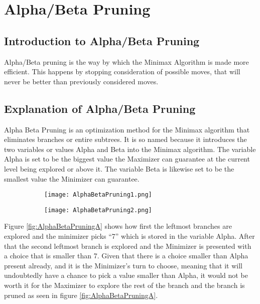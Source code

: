 \section{Alpha/Beta Pruning} 
\label{sec:Alpha/Beta Pruning}

\subsection{Introduction to Alpha/Beta Pruning}
\label{subsec:Introduction to Alpha/Beta Pruning}
Alpha/Beta pruning is the way by which the Minimax Algorithm is made more efficient.
This happens by stopping consideration of possible moves, that will never be better than previously considered moves.

\subsection{Explanation of Alpha/Beta Pruning}
\label{subsec:Explanation of Alpha/Beta Pruning}
Alpha Beta Pruning is an optimization method for the Minimax algorithm that eliminates branches or entire subtrees. 
It is so named because it introduces the two variables or values Alpha and Beta into the Minimax algorithm.
The variable Alpha is set to be the biggest value the Maximizer can guarantee at the current level being explored or above it.
The variable Beta is likewise set to be the smallest value the Minimizer can guarantee.

\begin{figure}
    \caption{An example of Alpha Beta Pruning} %
    \label{fig:AlphaBetaPruningA}
    \centering %
    \begin{subfigure}[b]{0.3\textwidth}
        \texttt{[image: AlphaBetaPruning1.png]}           
    \end{subfigure}
    \begin{subfigure}[b]{0.3\textwidth}
        \texttt{[image: AlphaBetaPruning2.png]}       
    \end{subfigure}
  \end{figure}

Figure \ref{fig:AlphaBetaPruningA} shows how first the leftmost branches are explored 
and the minimizer picks “7” which is stored in the variable Alpha. 
After that the second leftmost branch is explored and the Minimizer is presented with a choice that is smaller than 7.
Given that there is a choice smaller than Alpha present already, and it is the Minimizer’s turn to choose, 
meaning that it will undoubtedly have a chance to pick a value smaller than Alpha, 
it would not be worth it for the Maximizer to explore the rest of the branch and the branch is pruned as seen 
in figure \ref{fig:AlphaBetaPruningA}.

